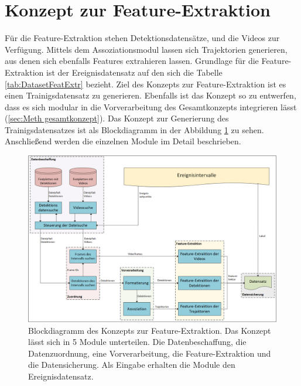 \section{Konzept zur Feature-Extraktion} \label{sec:Meth FeatExtr}
Für die Feature-Extraktion stehen Detektionsdatensätze, und die Videos zur Verfügung. Mittels dem Assoziationsmodul lassen sich Trajektorien generieren, aus denen sich ebenfalls Features extrahieren lassen. Grundlage für die Feature-Extraktion ist der Ereignisdatensatz auf den sich die Tabelle \ref{tab:DatasetFeatExtr} bezieht. Ziel des Konzepts zur Feature-Extraktion ist es einen Trainigsdatensatz zu generieren. Ebenfalls ist das Konzept so zu entwerfen, dass es sich modular in die Vorverarbeitung des Gesamtkonzepts integrieren lässt (\autoref{sec:Meth gesamtkonzept}). Das Konzept zur Generierung des Trainigsdatensatzes ist als Blockdiagramm in der Abbildung \ref{fig:KonzeptFeatExtr} zu sehen. Anschließend werden die einzelnen Module im Detail beschrieben.

\begin{figure}[htb]
    \centering
    \includegraphics[width=\textwidth]{img/Grafiken/Konzept Feature-Extraktion.png}
    \caption[Blockdiagramm des Konzepts zur Feature-Extraktion.]{Blockdiagramm des Konzepts zur Feature-Extraktion. Das Konzept lässt sich in 5 Module unterteilen. Die Datenbeschaffung, die Datenzuordnung, eine Vorverarbeitung, die Feature-Extraktion und die Datensicherung. Als Eingabe erhalten die Module den Ereignisdatensatz.}
    \label{fig:KonzeptFeatExtr}
\end{figure}

